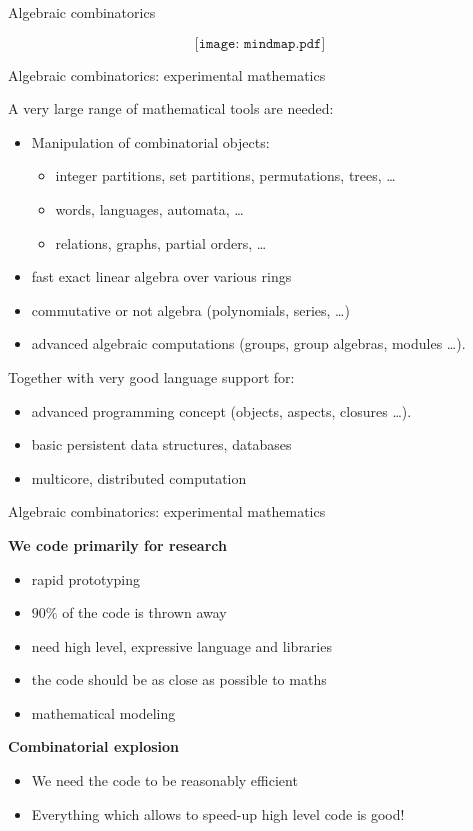 \documentclass[compress,11pt]{beamer}
\begin{document}
\begin{frame}{Algebraic combinatorics}

\[\texttt{[image: mindmap.pdf]}\]
\end{frame}
\begin{frame}{Algebraic combinatorics: experimental mathematics}

A very large range of mathematical tools are needed:
\begin{itemize}
\item Manipulation of combinatorial objects:
  \begin{itemize}
  \item integer partitions, set partitions, permutations, trees, \dots
  \item words, languages, automata, \dots
  \item relations, graphs, partial orders, \dots
  \end{itemize}
\item fast exact linear algebra over various rings
\item commutative or not algebra (polynomials, series, \dots)
\item advanced algebraic computations (groups, group algebras, modules \dots).
\end{itemize}
\bigskip\pause

Together with very good language support for:
\begin{itemize}
\item advanced programming concept (objects, aspects, closures \dots).
\item basic persistent data structures, databases
\item multicore, distributed computation
\end{itemize}
\end{frame}

\begin{frame}{Algebraic combinatorics: experimental mathematics}

\textbf{\Large We code primarily for research}
\begin{itemize}
\item rapid prototyping
\item $90\%$ of the code is thrown away
\bigskip\pause
\item need high level, expressive language and libraries
\item the code should be as close as possible to maths
\item mathematical modeling
\end{itemize}
\bigskip\pause
\textbf{\Large Combinatorial explosion}
\begin{itemize}
\item We need the code to be reasonably efficient
\item Everything which allows to speed-up high level code is good!
\end{itemize}
\end{frame}
\end{document}
